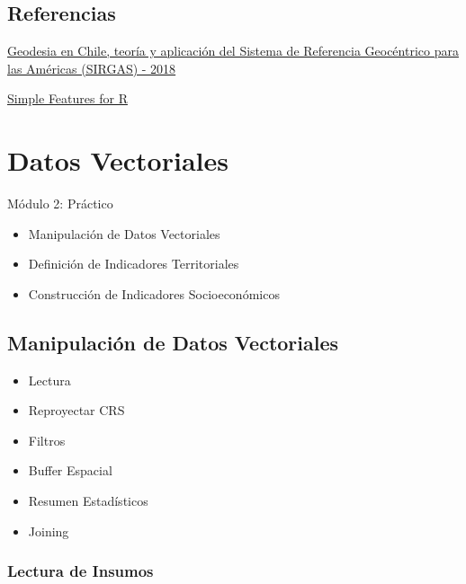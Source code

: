 \documentclass[
  letterpaper,
  DIV=11,
  numbers=noendperiod]{scrreprt}
\providecommand{\tightlist}{%
  \setlength{\itemsep}{0pt}\setlength{\parskip}{0pt}}\usepackage{longtable,booktabs,array}
\begin{document}
\hypertarget{referencias}{%
\section{Referencias}\label{referencias}}

\href{https://www.ide.cl/descargas/Geodesia-en-Chile.pdf}{Geodesia en
Chile, teoría y aplicación del Sistema de Referencia Geocéntrico para
las Américas (SIRGAS) - 2018}

\href{https://r-spatial.github.io/sf/}{Simple Features for R}


\hypertarget{datos-vectoriales-1}{%
\chapter{Datos Vectoriales}\label{datos-vectoriales-1}}

Módulo 2: Práctico

\hfill\break

\begin{itemize}
\tightlist
\item
  Manipulación de Datos Vectoriales
\item
  Definición de Indicadores Territoriales
\item
  Construcción de Indicadores Socioeconómicos
\end{itemize}

\hypertarget{manipulaciuxf3n-de-datos-vectoriales}{%
\section{Manipulación de Datos
Vectoriales}\label{manipulaciuxf3n-de-datos-vectoriales}}

\begin{itemize}
\tightlist
\item
  Lectura
\item
  Reproyectar CRS
\item
  Filtros
\item
  Buffer Espacial
\item
  Resumen Estadísticos
\item
  Joining
\end{itemize}

\hypertarget{lectura-de-insumos}{%
\subsection{Lectura de Insumos}\label{lectura-de-insumos}}
\end{document}
